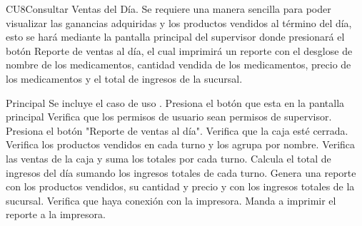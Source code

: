  \begin{UseCase}{CU8}{Consultar Ventas del Día.}{
		Se requiere una manera sencilla para poder visualizar las ganancias adquiridas y los productos vendidos al término del día, esto se hará
		mediante la pantalla principal del supervisor donde presionará el botón Reporte de ventas al día, el cual imprimirá un reporte con el
		desglose de nombre de los medicamentos, cantidad vendida de los medicamentos, precio de los medicamentos y el total de ingresos de la sucursal.
	}
	\end{UseCase}
	\begin{UCtrayectoria}{Principal}
		\UCpaso Se incluye el caso de uso .
		\UCpaso [\UCactor] Presiona el botón  que esta en la pantalla principal 
		\UCpaso Verifica que los permisos de usuario sean permisos de supervisor. 
		\UCpaso[\UCactor] Presiona el botón "Reporte de ventas al día".
		\UCpaso Verifica que la caja esté cerrada. 
		\UCpaso Verifica los productos vendidos en cada turno y los agrupa por nombre.
		\UCpaso Verifica las ventas de la caja y suma los totales por cada turno.
		\UCpaso Calcula el total de ingresos del día sumando los ingresos totales de cada turno.
		\UCpaso Genera una reporte con los productos vendidos, su cantidad y precio y con los ingresos totales de la sucursal.
		\UCpaso Verifica que haya conexión con la impresora.
		\UCpaso Manda a imprimir el reporte a la impresora.
	\end{UCtrayectoria}

